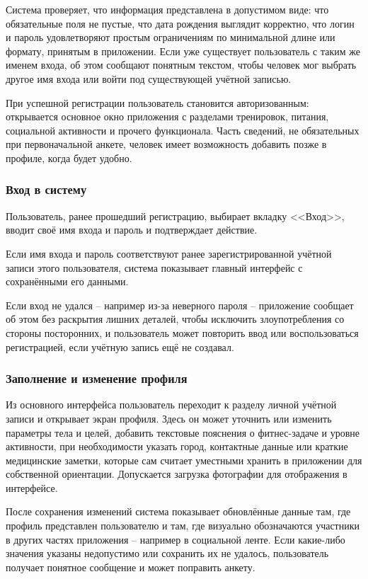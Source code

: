 Система проверяет, что информация представлена в допустимом виде: что обязательные поля не пустые, что дата рождения выглядит корректно, что логин и пароль удовлетворяют простым ограничениям по минимальной длине или формату, принятым в приложении. Если уже существует пользователь с таким же именем входа, об этом сообщают понятным текстом, чтобы человек мог выбрать другое имя входа или войти под существующей учётной записью.

При успешной регистрации пользователь становится авторизованным: открывается основное окно приложения с разделами тренировок, питания, социальной активности и прочего функционала. Часть сведений, не обязательных при первоначальной анкете, человек имеет возможность добавить позже в профиле, когда будет удобно.

\subsubsection{Вход в систему}

Пользователь, ранее прошедший регистрацию, выбирает вкладку <<Вход>>, вводит своё имя входа и пароль и подтверждает действие.

Если имя входа и пароль соответствуют ранее зарегистрированной учётной записи этого пользователя, система показывает главный интерфейс с сохранёнными его данными.

Если вход не удался -- например из-за неверного пароля -- приложение сообщает об этом без раскрытия лишних деталей, чтобы исключить злоупотребления со стороны посторонних, и пользователь может повторить ввод или воспользоваться регистрацией, если учётную запись ещё не создавал.

\subsubsection{Заполнение и изменение профиля}

Из основного интерфейса пользователь переходит к разделу личной учётной записи и открывает экран профиля. Здесь он может уточнить или изменить параметры тела и целей, добавить текстовые пояснения о фитнес-задаче и уровне активности, при необходимости указать город, контактные данные или краткие медицинские заметки, которые сам считает уместными хранить в приложении для собственной ориентации. Допускается загрузка фотографии для отображения в интерфейсе.

После сохранения изменений система показывает обновлённые данные там, где профиль представлен пользователю и там, где визуально обозначаются участники в других частях приложения -- например в социальной ленте. Если какие-либо значения указаны недопустимо или сохранить их не удалось, пользователь получает понятное сообщение и может поправить анкету.

